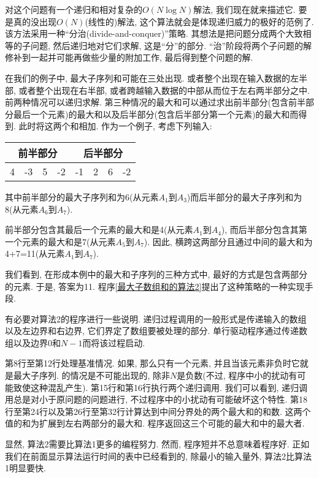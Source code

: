 \documentclass[oneside]{ctexbook}
\begin{document}
{对这个问题有一个递归和相对复杂的$O(N\log{N})$解法, 我们现在就来描述它. 要是真的没出现$O(N)$(线性的)解法, 这个算法就会是体现递归威力的极好的范例了. 该方法采用一种``分治(divide-and-conquer)''策略. 其想法是把问题分成两个大致相等的子问题, 然后递归地对它们求解, 这是``分''的部分. ``治''阶段将两个子问题的解修补到一起并可能再做些少量的附加工作, 最后得到整个问题的解.

在我们的例子中, 最大子序列和可能在三处出现. 或者整个出现在输入数据的左半部, 或者整个出现在右半部, 或者跨越输入数据的中部从而位于左右两半部分之中. 前两种情况可以递归求解. 第三种情况的最大和可以通过求出前半部分(包含前半部分最后一个元素)的最大和以及后半部分(包含后半部分第一个元素)的最大和而得到. 此时将这两个和相加. 作为一个例子, 考虑下列输入:

\begin{tabular}{|cccc|cccc|}
    \hline
    \multicolumn{4}{|c|}{前半部分} & \multicolumn{4}{|c|}{后半部分} \\
    \hline
    4 & -3 & 5 & -2 & -1 & 2 & 6 & -2 \\
    \hline
\end{tabular}

其中前半部分的最大子序列和为6(从元素$A_1$到$A_3$)而后半部分的最大子序列和为8(从元素$A_6$到$A_7$).

前半部分包含其最后一个元素的最大和是4(从元素$A_1$到$A_4$), 而后半部分包含其第一个元素的最大和是7(从元素$A_5$到$A_7$). 因此, 横跨这两部分且通过中间的最大和为4+7=11(从元素$A_1$到$A_7$).

我们看到, 在形成本例中的最大和子序列的三种方式中, 最好的方式是包含两部分的元素. 于是, 答案为11. 程序\ref{最大子数组和的算法2}提出了这种策略的一种实现手段.

有必要对算法2的程序进行一些说明. 递归过程调用的一般形式是传递输入的数组以及左边界和右边界, 它们界定了数组要被处理的部分. 单行驱动程序通过传递数组以及边界$0$和$N-1$而将该过程启动.

第8行至第12行处理基准情况. 如果, 那么只有一个元素, 并且当该元素非负时它就是最大子序列. 的情况是不可能出现的, 除非$N$是负数(不过, 程序中小的扰动有可能致使这种混乱产生). 第15行和第16行执行两个递归调用. 我们可以看到, 递归调用总是对小于原问题的问题进行, 不过程序中的小扰动有可能破坏这个特性. 第18行至第24行以及第26行至第32行计算达到中间分界处的两个最大和的和数. 这两个值的和为扩展到左右两部分的最大和. 程序返回这三个可能的最大和中的最大者.

显然, 算法2需要比算法1更多的编程努力. 然而, 程序短并不总意味着程序好. 正如我们在前面显示算法运行时间的表中已经看到的, 除最小的输入量外, 算法2比算法1明显要快.

}
\end{document}
